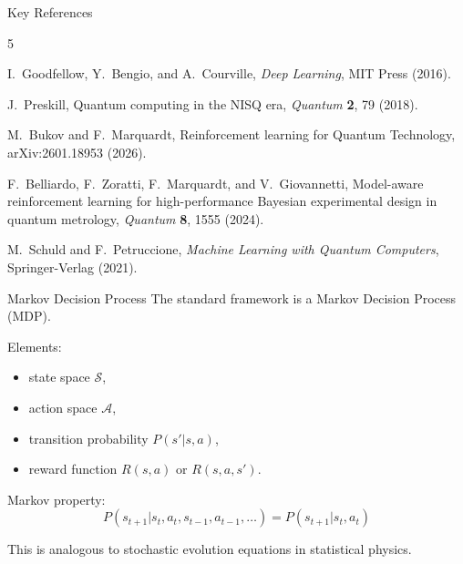 \documentclass[aspectratio=169]{beamer}
\begin{document}
\begin{frame}{Key References}

  \footnotesize
  \begin{thebibliography}{5}

    I.~Goodfellow, Y.~Bengio, and A.~Courville,
    \emph{Deep Learning},
    MIT Press (2016).

    J.~Preskill,
    Quantum computing in the NISQ era,
    \emph{Quantum} \textbf{2}, 79 (2018).

    M.~Bukov and F.~Marquardt,
    Reinforcement learning for Quantum Technology,
    arXiv:2601.18953 (2026).

    F.~Belliardo, F.~Zoratti, F.~Marquardt, and V.~Giovannetti,
    Model-aware reinforcement learning for high-performance
    Bayesian experimental design in quantum metrology,
    \emph{Quantum} \textbf{8}, 1555 (2024).

    M.~Schuld and F.~Petruccione,
    \emph{Machine Learning with Quantum Computers},
    Springer-Verlag (2021).

  \end{thebibliography}

\end{frame}






\begin{frame}{Markov Decision Process}
  The standard framework is a Markov Decision Process (MDP).

  Elements:
  \begin{itemize}
  \item state space $\mathcal S$,
  \item action space $\mathcal A$,
  \item transition probability $P(s'|s,a)$,
  \item reward function $R(s,a)$ or $R(s,a,s')$.
  \end{itemize}

  Markov property:
  \[
  P(s_{t+1}|s_t,a_t,s_{t-1},a_{t-1},\dots)=P(s_{t+1}|s_t,a_t)
  \]

  This is analogous to stochastic evolution equations in statistical physics.
\end{frame}
\end{document}
